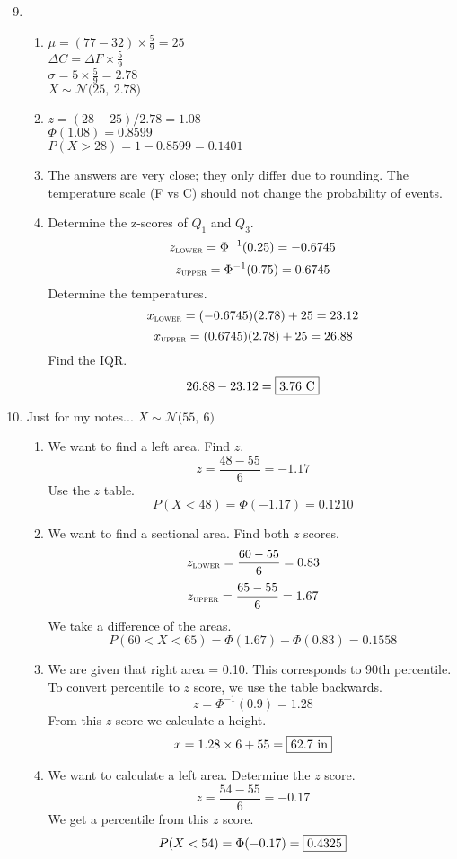 \documentclass[12pt,letterpaper]{article}
\begin{document}
\newcommand{\N}[2]{\mathcal{N}\big(#1,~#2\big)}
\newcommand{\AND}{\textsc{~and~}}
\newcommand{\OR}{\textsc{~or~}}

\begin{enumerate}
\setcounter{enumi}{8}
\item \begin{enumerate}
\item $\mu = (77-32)\times \frac{5}{9} = 25$\\
$\Delta C = \Delta F \times \frac{5}{9} $ \\
$\sigma = 5 \times \frac{5}{9} = 2.78$\\
$X \sim \N{25}{2.78}$
\item $z=(28-25)/2.78 = 1.08$\\
$\Phi(1.08) = 0.8599$\\
$P(X>28) = 1-0.8599 = 0.1401$
\item The answers are very close; they only differ due to rounding. The temperature scale (F vs C) should not change the probability of events.
\item Determine the z-scores of $Q_1$ and $Q_3$.
$$z_{\textsc{lower}} = \Phi^{-1}(0.25) = -0.6745$$
$$z_{\textsc{upper}} = \Phi^{-1}(0.75) = 0.6745 $$
Determine the temperatures.
$$x_{\textsc{lower}} = (-0.6745)(2.78)+25 = 23.12$$
$$x_{\textsc{upper}} = (0.6745)(2.78)+25 = 26.88$$
Find the IQR.
$$26.88-23.12 = \fbox{3.76\text{ C}}$$
\end{enumerate}

\item Just for my notes... $X\sim \N{55}{6}$
\begin{enumerate}
\item We want to find a left area. Find $z$.
$$z = \frac{48-55}{6} = -1.17$$
Use the $z$ table.
$$P(X < 48) = \Phi(-1.17) =  0.1210$$
\item We want to find a sectional area. Find both $z$ scores.
$$z_{\textsc{lower}} = \frac{60-55}{6} = 0.83$$
$$z_{\textsc{upper}} = \frac{65-55}{6} = 1.67$$
We take a difference of the areas.
$$P(60 < X < 65) = \Phi(1.67)-\Phi(0.83) = 0.1558$$
\item We are given that right area = 0.10. This corresponds to 90th percentile. To convert percentile to $z$ score, we use the table backwards.
$$z = \Phi^{-1}(0.9) = 1.28$$
From this $z$ score we calculate a height.
$$x = 1.28 \times 6 + 55 = \fbox{62.7\text{ in}}$$
\item We want to calculate a left area. Determine the $z$ score.
$$z = \frac{54-55}{6} = -0.17 $$
We get a percentile from this $z$ score.
$$P(X < 54) = \Phi(-0.17) = \fbox{0.4325} $$
\end{enumerate}


\end{enumerate}
\end{document}
